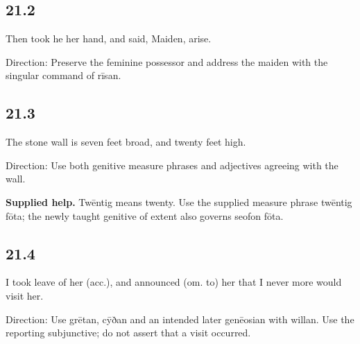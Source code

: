 \subsection*{21.2}

\par\begin{minipage}{\linewidth}\raggedright
Then took he her hand, and said, Maiden, arise.

Direction: Preserve the feminine possessor and address the maiden with the singular command of rīsan.

\end{minipage}\par\addvspace{4pt}

\subsection*{21.3}

\par\begin{minipage}{\linewidth}\raggedright
The stone wall is seven feet broad, and twenty feet high.

Direction: Use both genitive measure phrases and adjectives agreeing with the wall.

\end{minipage}\par\addvspace{4pt}

\textbf{Supplied help.} Twēntig means twenty. Use the supplied measure phrase twēntig fōta; the newly taught genitive of extent also governs seofon fōta.

\subsection*{21.4}

\par\begin{minipage}{\linewidth}\raggedright
I took leave of her (acc.), and announced (om. to) her that I never more would visit her.

Direction: Use grētan, cȳðan and an intended later genēosian with willan. Use the reporting subjunctive; do not assert that a visit occurred.

\end{minipage}\par\addvspace{4pt}

